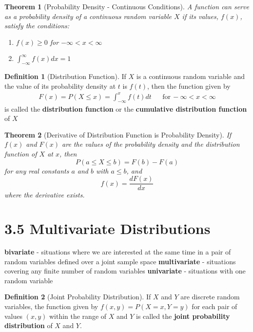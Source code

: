 \documentclass[
10pt,reqno
]{amsart}
\newtheorem{thm}{Theorem}[section]
\theoremstyle{definition}
\newtheorem{definition}{Definition}[section]
\begin{document}
\begin{thm}[Probability Density - Continuous Conditions]
A function can serve as a probability density of a continuous random variable \(X\) if its values, \(f(x)\), satisfy the conditions:
\begin{enumerate}
	\item \(f(x) \ge 0\) for \(- \infty < x < \infty \)
	\item \(\int_{-\infty}^{\infty} f(x) dx = 1\)
\end{enumerate}
\end{thm}

\begin{definition}[Distribution Function]
If \(X\) is a continuous random variable and the value of its probability density at \(t\) is \(f(t)\), then the function given by
\begin{align*}
F(x)=P(X \leq x)= \int_{- \infty}^{x} f(t) dt && \text{for} \, -\infty < x < \infty
\end{align*}
is called the \textbf{distribution function} or the \textbf{cumulative distribution function} of \(X\)
\end{definition}

\begin{thm}[Derivative of Distribution Function is Probability Density]
If \(f(x)\) and \(F(x)\) are the values of the probability density and the distribution function of \(X\) at \(x\), then
\[
P(a \leq X \leq b) = F(b)-F(a)
\]
for any real constants \(a\) and \(b\) with \(a \leq b\), and
\[
f(x)=\frac{dF(x)}{dx}
\]
where the derivative exists.
\end{thm}

\section*{3.5 Multivariate Distributions}

\textbf{bivariate} - situations where we are interested at the same time in a pair of random variables defined over a joint sample space
\textbf{multivariate} - situations covering any finite number of random variables
\textbf{univariate} - situations with one random variable

\begin{definition}[Joint Probability Distribution]
If \(X\) and \(Y\) are discrete random variables, the function given by \(f(x,y)=P(X=x,Y=y)\) for each pair of values \((x,y)\) within the range of \(X\) and \(Y\) is called the \textbf{joint probability distribution} of \(X\) and \(Y\).
\end{definition}
\end{document}
